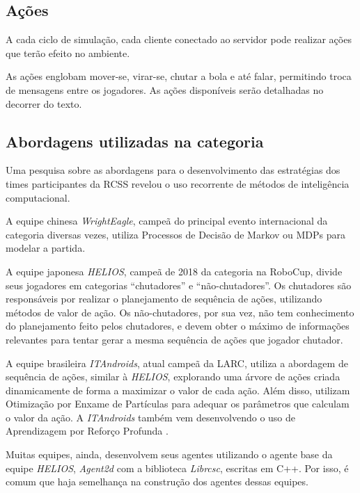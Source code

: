 \subsection{Ações}
\label{sec:actions}

A cada ciclo de simulação, cada cliente conectado ao servidor pode realizar ações que terão efeito no ambiente.\cite{rcssmanual2003}

As ações englobam mover-se, virar-se, chutar a bola e até falar, permitindo troca de mensagens entre os jogadores. As ações disponíveis serão detalhadas no decorrer do texto.


\subsection{Abordagens utilizadas na categoria}
\label{subsec:abordagens}
\par Uma pesquisa sobre as abordagens para o desenvolvimento das estratégias dos times participantes da RCSS revelou o uso recorrente de métodos de inteligência computacional.
\par A equipe chinesa \textit{WrightEagle}, campeã do principal evento internacional da categoria diversas vezes, utiliza Processos de Decisão de Markov ou MDPs para modelar a partida\cite{bai2015online}.
\par A equipe japonesa \textit{HELIOS}, campeã de 2018 da categoria na RoboCup, divide seus jogadores em categorias ``chutadores'' e ``não-chutadores''.
Os chutadores são responsáveis por realizar o planejamento de sequência de ações, utilizando métodos de valor de ação.
Os não-chutadores, por sua vez, não tem conhecimento do planejamento feito pelos chutadores, e devem obter o máximo de informações relevantes para tentar gerar a mesma sequência de ações que jogador chutador\cite{nakashima2018helios2018}.
\par A equipe brasileira \textit{ITAndroids}, atual campeã da LARC, utiliza a abordagem de sequência de ações, similar à \textit{HELIOS}, explorando uma árvore de ações criada dinamicamente de forma a maximizar o valor de cada ação. Além disso, utilizam Otimização por Enxame de Partículas \cite{melloitandroids} para adequar os parâmetros que calculam o valor da ação. A \textit{ITAndroids} também vem desenvolvendo o uso de Aprendizagem por Reforço Profunda \cite{maximoitandroids}.
\par Muitas equipes, ainda, desenvolvem seus agentes utilizando o agente base da equipe \textit{HELIOS}, \textit{Agent2d} com a biblioteca \textit{Librcsc}, escritas em C++. Por isso, é comum que haja semelhança na construção dos agentes dessas equipes.

